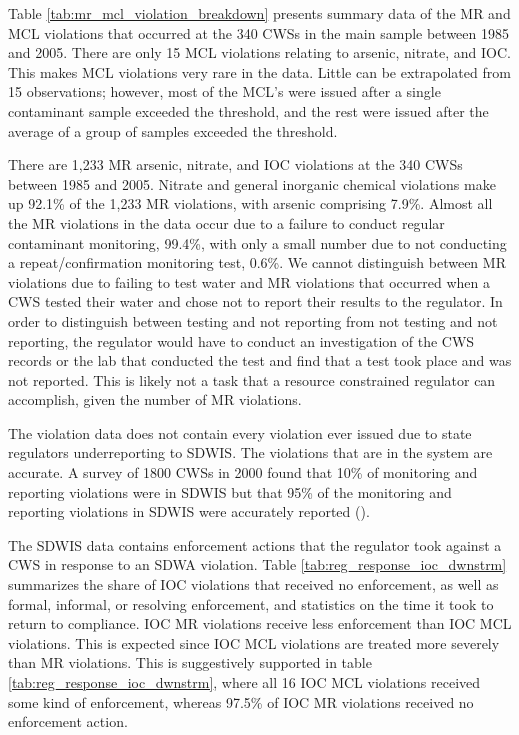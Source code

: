 \documentclass{article}
\begin{document}
Table \ref{tab:mr_mcl_violation_breakdown} presents summary data of the MR and MCL violations that occurred at the 340 CWSs in the main sample between 1985 and 2005. There are only 15 MCL violations relating to arsenic, nitrate, and IOC. This makes MCL violations very rare in the data. Little can be extrapolated from 15 observations; however, most of the MCL's were issued after a single contaminant sample exceeded the threshold, and the rest were issued after the average of a group of samples exceeded the threshold.

There are 1,233 MR arsenic, nitrate, and IOC violations at the 340 CWSs between 1985 and 2005. Nitrate and general inorganic chemical violations make up 92.1\% of the 1,233 MR violations, with arsenic comprising 7.9\%. Almost all the MR violations in the data occur due to a failure to conduct regular contaminant monitoring, 99.4\%, with only a small number due to not conducting a repeat/confirmation monitoring test, 0.6\%. We cannot distinguish between MR violations due to failing to test water and MR violations that occurred when a CWS tested their water and chose not to report their results to the regulator. In order to distinguish between testing and not reporting from not testing and not reporting, the regulator would have to conduct an investigation of the CWS records or the lab that conducted the test and find that a test took place and was not reported. This is likely not a task that a resource constrained regulator can accomplish, given the number of MR violations.

The violation data does not contain every violation ever issued due to state regulators underreporting to SDWIS. The violations that are in the system are accurate. A survey of 1800 CWSs in 2000 found that 10\% of monitoring and reporting violations were in SDWIS but that 95\% of the monitoring and reporting violations in SDWIS were accurately reported (\cite{epaviolationreliability}).

The SDWIS data contains enforcement actions that the regulator took against a CWS in response to an SDWA violation. Table \ref{tab:reg_response_ioc_dwnstrm} summarizes the share of IOC violations that received no enforcement, as well as formal, informal, or resolving enforcement, and statistics on the time it took to return to compliance. IOC MR violations receive less enforcement than IOC MCL violations. This is expected since IOC MCL violations are treated more severely than MR violations. This is suggestively supported in table \ref{tab:reg_response_ioc_dwnstrm}, where all 16 IOC MCL violations received some kind of enforcement, whereas 97.5\% of IOC MR violations received no enforcement action. 
\end{document}
